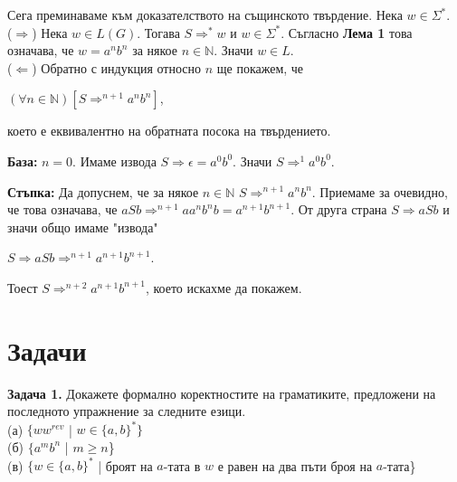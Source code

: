 \documentclass{article}
\begin{document}
    \vspace{10pt}

    Сега преминаваме към доказателството на същинското твърдение. Нека $w \in \Sigma^*$. \\
    ($\Rightarrow$) Нека $w \in L(G)$. Тогава $S \Rightarrow^* w$ и $w \in \Sigma^*$. Съгласно
    \textbf{Лема 1} това означава, че $w = a^nb^n$ за някое $n\in\mathbb{N}$. Значи 
    $w \in L$. \\
    ($\Leftarrow$) Обратно с индукция относно $n$ ще покажем, че \\
    \begin{center}
        $(\forall n \in \mathbb{N})[S \Rightarrow^{n+1} a^nb^n]$,
    \end{center}
    което е еквивалентно на обратната посока на твърдението.

    \vspace{5pt}

    \textbf{База:} $n = 0$. Имаме извода $S \Rightarrow \epsilon = a^0b^0$. Значи $S \Rightarrow^1 a^0b^0$. \\
    
    \vspace{5pt}

    \textbf{Стъпка:} Да допуснем, че за някое $n\in\mathbb{N}$ $S \Rightarrow^{n+1} a^nb^n$. Приемаме за 
    очевидно, че това означава, че $aSb \Rightarrow^{n+1} aa^nb^nb = a^{n+1}b^{n+1}$. От друга страна
    $S \Rightarrow aSb$ и значи общо имаме "извода" \\
    \begin{center}
        $S \Rightarrow aSb \Rightarrow^{n+1} a^{n+1}b^{n+1}$.
    \end{center} 
    Тоест $S \Rightarrow^{n+2} a^{n+1}b^{n+1}$, което искахме да покажем.
    
\section{Задачи}
    \textbf{Задача 1.} Докажете формално коректностите на граматиките, предложени на 
    последното упражнение за следните езици. \\
    (а) $\{ww^{rev}$ | $w \in \{a,b\}^*\}$ \\
    (б) $\{a^mb^n$ | $m \geq n$\} \\
    (в) $\{w \in \{a,b\}^*$ | броят на $a$-тата в $w$ е равен на два пъти броя на $a$-тата\}
\vspace{25pt}
  
\end{document}
